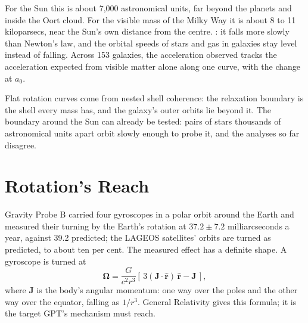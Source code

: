 \documentclass[11pt,a4paper]{article}
\begin{document}
For the Sun this is about 7,000 astronomical units, far beyond the planets and inside the Oort cloud. For the visible mass of the Milky Way it is about 8 to 11 kiloparsecs, near the Sun's own distance from the centre. : it falls more slowly than Newton's law, and the orbital speeds of stars and gas in galaxies stay level instead of falling. Across 153 galaxies, the acceleration observed tracks the acceleration expected from visible matter alone along one curve, with the change at $a_0$.

Flat rotation curves come from nested shell coherence: the relaxation boundary is the shell every mass has, and the galaxy's outer orbits lie beyond it.  The boundary around the Sun can already be tested: pairs of stars thousands of astronomical units apart orbit slowly enough to probe it, and the analyses so far disagree.

\section{Rotation's Reach}
\label{sec:rotation}

 Gravity Probe B carried four gyroscopes in a polar orbit around the Earth and measured their turning by the Earth's rotation at $37.2 \pm 7.2$ milliarcseconds a year, against 39.2 predicted; the LAGEOS satellites' orbits are turned as predicted, to about ten per cent. The measured effect has a definite shape. A gyroscope is turned at
\begin{equation}
\boldsymbol{\Omega} = \frac{G}{c^2 r^3}\left[\,3(\mathbf{J}\cdot\hat{\mathbf{r}})\,\hat{\mathbf{r}} - \mathbf{J}\,\right],
\end{equation}
where $\mathbf{J}$ is the body's angular momentum: one way over the poles and the other way over the equator, falling as $1/r^3$. General Relativity gives this formula; it is the target GPT's mechanism must reach.
\end{document}
